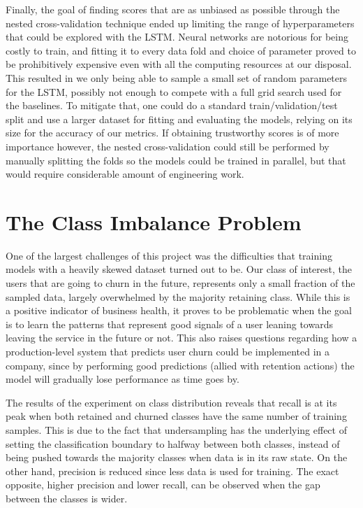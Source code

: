 \documentclass{kththesis}
\begin{document}
Finally, the goal of finding scores that are as unbiased as possible through the nested cross-validation technique ended up limiting the range of hyperparameters that could be explored with the LSTM. Neural networks are notorious for being costly to train, and fitting it to every data fold and choice of parameter proved to be prohibitively expensive even with all the computing resources at our disposal. This resulted in we only being able to sample a small set of random parameters for the LSTM, possibly not enough to compete with a full grid search used for the baselines. To mitigate that, one could do a standard train/validation/test split and use a larger dataset for fitting and evaluating the models, relying on its size for the accuracy of our metrics. If obtaining trustworthy scores is of more importance however, the nested cross-validation could still be performed by manually splitting the folds so the models could be trained in parallel, but that would require considerable amount of engineering work.


\section{The Class Imbalance Problem}
\label{sec:dis_class_dist}

One of the largest challenges of this project was the difficulties that training models with a heavily skewed dataset turned out to be. Our class of interest, the users that are going to churn in the future, represents only a small fraction of the sampled data, largely overwhelmed by the majority retaining class. While this is a positive indicator of business health, it proves to be problematic when the goal is to learn the patterns that represent good signals of a user leaning towards leaving the service in the future or not. This also raises questions regarding how a production-level system that predicts user churn could be implemented in a company, since by performing good predictions (allied with retention actions) the model will gradually lose performance as time goes by.

The results of the experiment on class distribution reveals that recall is at its peak when both retained and churned classes have the same number of training samples. This is due to the fact that undersampling has the underlying effect of setting the classification boundary to halfway between both classes, instead of being pushed towards the majority classes when data is in its raw state. On the other hand, precision is reduced since less data is used for training. The exact opposite, higher precision and lower recall, can be observed when the gap between the classes is wider.
\end{document}

